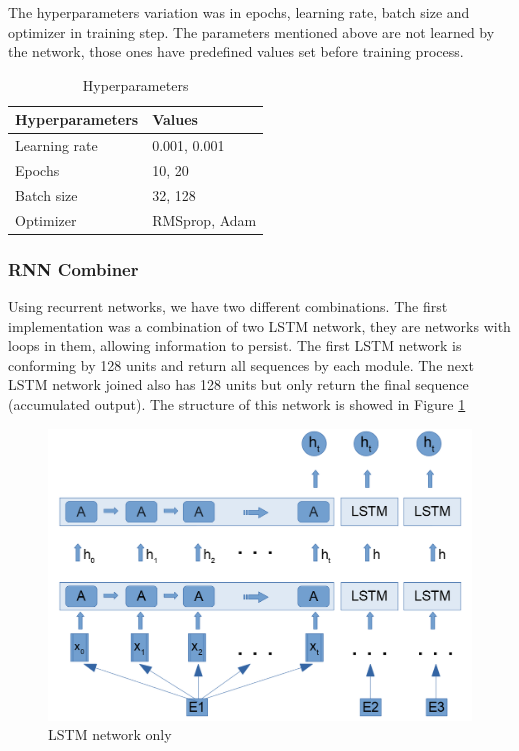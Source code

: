 \documentclass[12pt]{report}
\begin{document}
The hyperparameters variation was in epochs, learning rate, batch size and optimizer in training step. The parameters mentioned above are not learned by the network, those ones have predefined values set before training process.

\begin{table}[htb]
	\centering
	\begin{tabular}{||M{4.5cm}|M{4cm}||}
		\hline
		\textbf{Hyperparameters} 	& \textbf{Values} 	\\ \hline
		Learning rate           	& 0.001, 0.001      \\ \hline
		Epochs         				& 10, 20            \\ \hline
		Batch size           		& 32, 128 			\\ \hline		Optimizer                 	& RMSprop, Adam     \\ \hline	
	\end{tabular}
	\caption{Hyperparameters}\label{Hyperparameters}
\end{table}

\subsubsection{\ac{RNN} Combiner}
Using recurrent networks, we have two different combinations. The first implementation was a combination of two LSTM network, they are networks with loops in them, allowing information to persist. The first LSTM network is conforming by 128 units and return all sequences by each module. The next LSTM network joined also has 128 units but only return the final sequence (accumulated output). The structure of this network is showed in Figure \ref{figure:lstm_only}

\begin{figure}[H]	
	\centering
	\includegraphics[width=150mm, scale = 1]{images/12_lstm_only.png}	
	\caption{LSTM network only}	
	\label{figure:lstm_only}
\end{figure}
\end{document}
